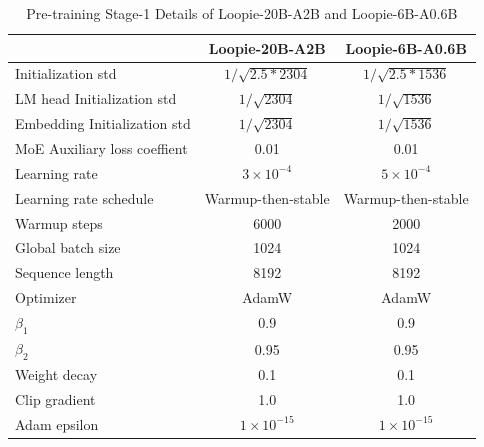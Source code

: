 \newpage
{}
\begin{table}[!hbp]
\centering
\caption{Pre-training Stage-1 Details of Loopie-20B-A2B and Loopie-6B-A0.6B}
\vspace{2pt}
{\small
\setlength{\tabcolsep}{20pt}
\renewcommand{\arraystretch}{1.5}
\begin{tabular}{l|cc}
\toprule
 & Loopie-20B-A2B & Loopie-6B-A0.6B  \\
\midrule
Initialization std & $1/\sqrt{2.5*2304}$ & $1/\sqrt{2.5*1536}$ \\
LM head Initialization std & $1/\sqrt{2304}$ & $1/\sqrt{1536}$ \\
Embedding Initialization std & $1/\sqrt{2304}$ & $1/\sqrt{1536}$ \\
MoE Auxiliary loss coeffient & 0.01 & 0.01 \\
Learning rate & $3\times10^{-4}$  & $5\times10^{-4}$  \\
Learning rate schedule & Warmup-then-stable & Warmup-then-stable  \\
Warmup steps & 6000  & 2000 \\
Global batch size & 1024  & 1024 \\
Sequence length & 8192  & 8192 \\
Optimizer & AdamW  & AdamW \\
$\beta_1$ & 0.9 & 0.9  \\
$\beta_2$ & 0.95 & 0.95 \\
Weight decay & 0.1  & 0.1 \\
Clip gradient & 1.0  & 1.0 \\
Adam epsilon & $1\times10^{-15}$ & $1\times10^{-15}$ \\
\bottomrule
\end{tabular}
}
\label{tab:pretrain-stage1-details}
\end{table}






